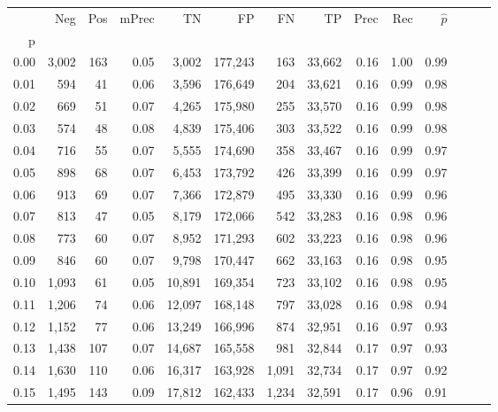 \begin{tabular}{rrrrrrrrrrrrrr}
\toprule
{} &    Neg &  Pos & mPrec &       TN &       FP &      FN &      TP &  Prec &   Rec & $\hat{p}$ \\
p    &        &      &       &          &          &         &         &       &       &           \\
\midrule
0.00 &  3,002 &  163 &  0.05 &    3,002 &  177,243 &     163 &  33,662 &  0.16 &  1.00 &      0.99 \\
0.01 &    594 &   41 &  0.06 &    3,596 &  176,649 &     204 &  33,621 &  0.16 &  0.99 &      0.98 \\
0.02 &    669 &   51 &  0.07 &    4,265 &  175,980 &     255 &  33,570 &  0.16 &  0.99 &      0.98 \\
0.03 &    574 &   48 &  0.08 &    4,839 &  175,406 &     303 &  33,522 &  0.16 &  0.99 &      0.98 \\
0.04 &    716 &   55 &  0.07 &    5,555 &  174,690 &     358 &  33,467 &  0.16 &  0.99 &      0.97 \\
0.05 &    898 &   68 &  0.07 &    6,453 &  173,792 &     426 &  33,399 &  0.16 &  0.99 &      0.97 \\
0.06 &    913 &   69 &  0.07 &    7,366 &  172,879 &     495 &  33,330 &  0.16 &  0.99 &      0.96 \\
0.07 &    813 &   47 &  0.05 &    8,179 &  172,066 &     542 &  33,283 &  0.16 &  0.98 &      0.96 \\
0.08 &    773 &   60 &  0.07 &    8,952 &  171,293 &     602 &  33,223 &  0.16 &  0.98 &      0.96 \\
0.09 &    846 &   60 &  0.07 &    9,798 &  170,447 &     662 &  33,163 &  0.16 &  0.98 &      0.95 \\
0.10 &  1,093 &   61 &  0.05 &   10,891 &  169,354 &     723 &  33,102 &  0.16 &  0.98 &      0.95 \\
0.11 &  1,206 &   74 &  0.06 &   12,097 &  168,148 &     797 &  33,028 &  0.16 &  0.98 &      0.94 \\
0.12 &  1,152 &   77 &  0.06 &   13,249 &  166,996 &     874 &  32,951 &  0.16 &  0.97 &      0.93 \\
0.13 &  1,438 &  107 &  0.07 &   14,687 &  165,558 &     981 &  32,844 &  0.17 &  0.97 &      0.93 \\
0.14 &  1,630 &  110 &  0.06 &   16,317 &  163,928 &   1,091 &  32,734 &  0.17 &  0.97 &      0.92 \\
0.15 &  1,495 &  143 &  0.09 &   17,812 &  162,433 &   1,234 &  32,591 &  0.17 &  0.96 &      0.91 \\

\end{tabular}
